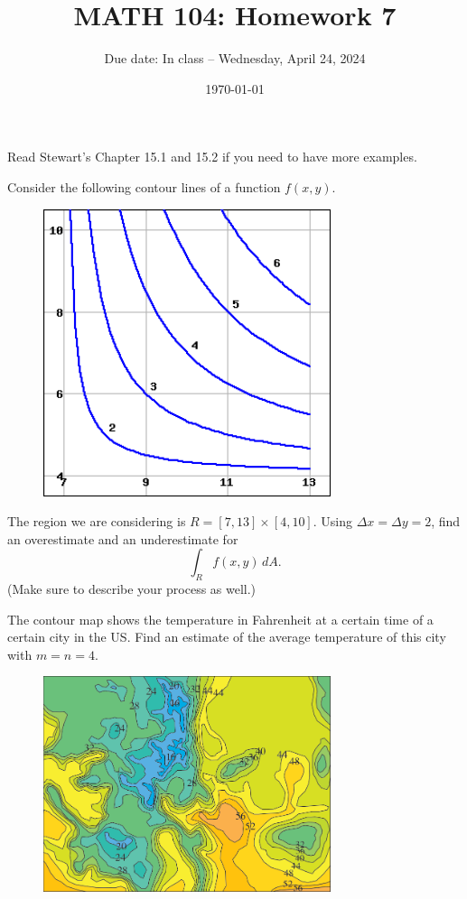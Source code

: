 \documentclass[12pt]{amsart}
\title{ MATH 104: Homework 7}
\author{Due date: In class -- Wednesday, April 24, 2024}
\date{\today}
\begin{document}
\maketitle

Read Stewart's Chapter 15.1 and 15.2 if you need to have more examples.

\begin{problem}
    Consider the following contour lines of a function $f(x,y)$.
    \begin{figure}[!ht]
        \includegraphics[width=0.75\textwidth]{fig/contour.png}
    \end{figure}
    The region we are considering is $R = [7,13]\times [4, 10]$.
    Using $\Delta x = \Delta y = 2$, find an overestimate and
    an underestimate for 
    $$\int_R f(x,y) \, dA.$$
    (Make sure to describe your process as well.)
\end{problem}

\begin{problem}
    The contour map shows the temperature in Fahrenheit at a certain time
    of a certain city in the US.
    Find an estimate of the average temperature of this city with $m =n=4$.
    \begin{figure}[!ht]
        \includegraphics[width=0.75\textwidth]{fig/contour-temperature.png}
    \end{figure}
\end{problem}
\end{document}
